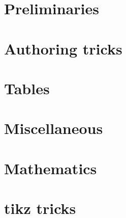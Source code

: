 \documentclass[oneside]{book}
\begin{document}
	
	\tableofcontents
	
	\chapter{Preliminaries}
	
	
	
	\chapter{Authoring tricks}
		
	
	\chapter{Tables}
	
	
	\chapter{Miscellaneous}	
	
	
	\chapter{Mathematics}
	
	
	\chapter{tikz tricks}
	
\end{document}
